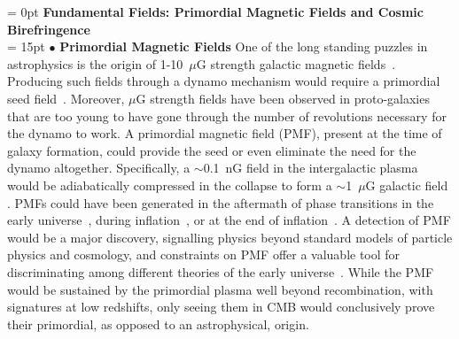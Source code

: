 \documentclass[PICOReport.tex]{subfiles}
\begin{document}
\vspace{0.1in}
\parindent = 0pt
{\bf Fundamental Fields: Primordial Magnetic Fields and Cosmic Birefringence} \\ %
\parindent = 15pt
$\bullet$ {\bf Primordial Magnetic Fields} \hspace{0.1in} One of the long standing puzzles in astrophysics is the origin of 1-10~$\mu$G strength galactic magnetic fields~\cite{Widrow:2002ud}. Producing such fields through a dynamo mechanism would require a primordial seed field~\cite{Widrow:2011hs}. Moreover, $\mu$G strength fields have been observed in proto-galaxies that are too young to have gone through the number of revolutions necessary for the dynamo to work. A primordial magnetic field (PMF), present at the time of galaxy formation, could provide the seed or even eliminate the need for the dynamo altogether. Specifically,  a $\sim$0.1~nG field in the intergalactic plasma would be adiabatically compressed in the collapse to form a $\sim$1~$\mu$G galactic field \cite{Grasso:2000wj}.
PMFs could have been generated in the aftermath of phase transitions in the early universe~\cite{Vachaspati:1991nm}, during inflation~\cite{Turner:1987bw,Ratra:1991bn}, or at the end of inflation~\cite{DiazGil:2007dy}. A detection of PMF would be a major discovery, signalling physics beyond standard models of particle physics and cosmology, and constraints on PMF offer a valuable tool for discriminating among different theories of the early universe~\cite{Barnaby:2012tk,Long:2013tha,Durrer:2013pga}. While the PMF would be sustained by the primordial plasma well beyond recombination, with signatures at low redshifts, only seeing them in CMB would conclusively prove their primordial, as opposed to an astrophysical, origin.
\end{document}
